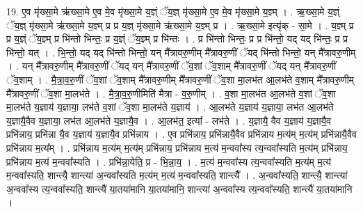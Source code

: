\documentclass[17pt]{extarticle}
\begin{document}
19. ए॒व मृ॑ख्सा॒मे ऋ॑ख्सा॒मे ए॒व मे॒व मृ॑ख्सा॒मे य॒ज्ञ्ं ॅय॒ज्ञ् मृ॑ख्सा॒मे ए॒व मे॒व मृ॑ख्सा॒मे य॒ज्ञ्म् । . ऋ॒ख्सा॒मे य॒ज्ञ्ं ॅय॒ज्ञ् मृ॑ख्सा॒मे ऋ॑ख्सा॒मे य॒ज्ञ्म् प्र प्र य॒ज्ञ् मृ॑ख्सा॒मे ऋ॑ख्सा॒मे य॒ज्ञ्म् प्र । . ऋ॒ख्सा॒मे इत्यृ॑क् - सा॒मे । . य॒ज्ञ्म् प्र प्र य॒ज्ञ्ं ॅय॒ज्ञ्म् प्र भि॑न्तो भिन्तः॒ प्र य॒ज्ञ्ं ॅय॒ज्ञ्म् प्र भि॑न्तः । . प्र भि॑न्तो भिन्तः॒ प्र प्र भि॑न्तो॒ यद् यद् भि॑न्तः॒ प्र प्र भि॑न्तो॒ यत् । . भि॒न्तो॒ यद् यद् भि॑न्तो भिन्तो॒ यन् मै᳚त्रावरु॒णीम् मै᳚त्रावरु॒णीं ॅयद् भि॑न्तो भिन्तो॒ यन् मै᳚त्रावरु॒णीम् । . यन् मै᳚त्रावरु॒णीम् मै᳚त्रावरु॒णीं ॅयद् यन् मै᳚त्रावरु॒णीं ॅव॒शां ॅव॒शाम् मै᳚त्रावरु॒णीं ॅयद् यन् मै᳚त्रावरु॒णीं ॅव॒शाम् । . मै॒त्रा॒व॒रु॒णीं ॅव॒शां ॅव॒शाम् मै᳚त्रावरु॒णीम् मै᳚त्रावरु॒णीं ॅव॒शा मा॒लभ॑त आ॒लभ॑ते व॒शाम् मै᳚त्रावरु॒णीम् मै᳚त्रावरु॒णीं ॅव॒शा मा॒लभ॑ते । . मै॒त्रा॒व॒रु॒णीमिति॑ मैत्रा - व॒रु॒णीम् । . व॒शा मा॒लभ॑त आ॒लभ॑ते व॒शां ॅव॒शा मा॒लभ॑ते य॒ज्ञाय॑ य॒ज्ञाया॒ लभ॑ते व॒शां ॅव॒शा मा॒लभ॑ते य॒ज्ञाय॑ । . आ॒लभ॑ते य॒ज्ञाय॑ य॒ज्ञाया॒ लभ॑त आ॒लभ॑ते य॒ज्ञायै॒वैव य॒ज्ञाया॒ लभ॑त आ॒लभ॑ते य॒ज्ञायै॒व । . आ॒लभ॑त॒ इत्या᳚ - लभ॑ते । . य॒ज्ञायै॒ वैव य॒ज्ञाय॑ य॒ज्ञायै॒व प्रभि॑न्नाय॒ प्रभि॑न्ना यै॒व य॒ज्ञाय॑ य॒ज्ञायै॒व प्रभि॑न्नाय । . ए॒व प्रभि॑न्नाय॒ प्रभि॑न्नायै॒वैव प्रभि॑न्नाय म॒त्य॑म् म॒त्य॑म् प्रभि॑न्नायै॒वैव प्रभि॑न्नाय म॒त्य᳚म् । . प्रभि॑न्नाय म॒त्य॑म् म॒त्य॑म् प्रभि॑न्नाय॒ प्रभि॑न्नाय म॒त्य॑ म॒न्ववा᳚स्य त्य॒न्ववा᳚स्यति म॒त्य॑म् प्रभि॑न्नाय॒ प्रभि॑न्नाय म॒त्य॑ म॒न्ववा᳚स्यति । . प्रभि॑न्ना॒येति॒ प्र - भि॒न्ना॒य॒ । . म॒त्य॑ म॒न्ववा᳚स्य त्य॒न्ववा᳚स्यति म॒त्य॑म् म॒त्य॑ म॒न्ववा᳚स्यति॒ शान्त्यै॒ शान्त्या॑ अ॒न्ववा᳚स्यति म॒त्य॑म् म॒त्य॑ म॒न्ववा᳚स्यति॒ शान्त्यै᳚ । . अ॒न्ववा᳚स्यति॒ शान्त्यै॒ शान्त्या॑ अ॒न्ववा᳚स्य त्य॒न्ववा᳚स्यति॒ शान्त्यै॑ या॒तया॑मानि या॒तया॑मानि॒ शान्त्या॑ अ॒न्ववा᳚स्य त्य॒न्ववा᳚स्यति॒ शान्त्यै॑ या॒तया॑मानि । \newline
\end{document}
